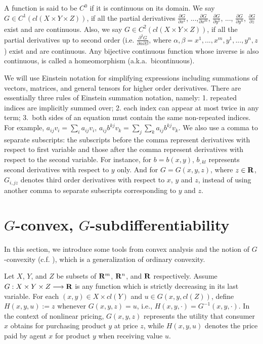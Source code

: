 A function is said to be $C^0$ if it is continuous on its domain. We say $G \in C^{1}(cl(X\times Y \times Z))$, if all the partial derivatives $\frac{\partial G}{\partial x^1}$, ...,$\frac{\partial G}{\partial x^m}$, $\frac{\partial G}{\partial y^1}$, ..., $\frac{\partial G}{\partial y^n}$, $\frac{\partial G}{\partial z}$ exist and are continuous. Also, we say $G \in C^{2}(cl(X\times Y \times Z))$, if all the partial derivatives up to second order (i.e. $\frac{\partial^2 G}{\partial \alpha \partial \beta}$, where $\alpha, \beta = x^1, ... , x^m, y^1, ..., y^n, z$) exist and are continuous. Any bijective continuous function whose inverse is also continuous, is called a homeomorphism (a.k.a.\ bicontinuous).
\medskip

We will use Einstein notation for simplifying expressions including summations of vectors, matrices, and general tensors for higher order derivatives. There are essentially three rules of Einstein summation notation, namely: 1. repeated indices are implicitly summed over; 2. each index can appear at most twice in any term; 3.~both sides of an equation must contain the same non-repeated indices. For example, $a_{ij}v_i =\sum_{i}a_{ij}v_i$, $a_{ij}b^{kj}v_k=\sum_{j}\sum_{k}a_{ij}b^{kj}v_k$. We also use a comma to separate subscripts: the subscripts before the comma represent derivatives with respect to first variable and those after the comma represent derivatives with respect to the second variable. For instance, for $b=b(x,y)$, $b_{,kl}$ represents second derivatives with respect to $y$ only. And for $G=G(x,y,z)$, where $z\in {\mathbf R}$, $G_{i,jz}$ denotes third order derivatives with respect to $x$, $y$ and $z$, instead of using another comma to separate subscripts corresponding to $y$ and $z$.\medskip


\section{$G$-convex, $G$-subdifferentiability}\label{section:G-convexity}
In this section, we introduce some tools from convex analysis and the notion of $G$-convexity  (c.f. \cite{Trudinger14,Balder77,Singer97}), which is a generalization of ordinary convexity. \medskip

Let $X$, $Y$, and $Z$ be subsets of ${\mathbf R}^m$, ${\mathbf R}^n$, and ${\mathbf R}$ respectively. Assume $G: X \times Y \times Z \longrightarrow {\mathbf R}$ is any function which is strictly decreasing in its last variable. For each $(x, y) \in X\times cl(Y)$ and $u\in G(x,y, cl(Z))$, define $H(x,y,u) := z$ whenever $G(x,y,z) = u$, i.e., $H(x, y, \cdot)= G^{-1}(x,y,\cdot)$. In the context of nonlinear pricing, $G(x,y,z)$ represents the utility that consumer $x$ obtains for purchasing product $y$ at price $z$, while $H(x,y,u)$ denotes the price paid by agent $x$ for product $y$ when receiving value $u$. \medskip



